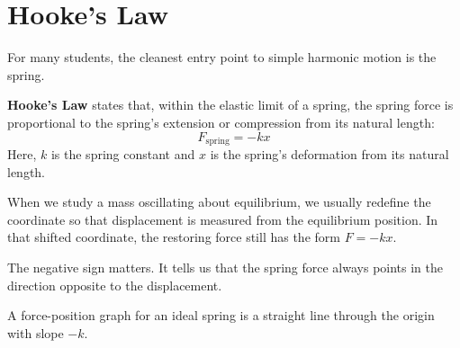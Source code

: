 

\usepackage{enumitem}
\usepackage{hyperref}
\usepackage{mathtools}
\usepackage{siunitx}

\hypersetup{colorlinks=true,linkcolor=blue,urlcolor=blue}

\newcommand{\dd}{\mathrm{d}}
\newcommand{\abs}[1]{\left|#1\right|}



\maketitle

\section{Hooke's Law}
For many students, the cleanest entry point to simple harmonic motion is the spring.

\textbf{Hooke's Law} states that, within the elastic limit of a spring, the spring force is proportional to the spring's extension or compression from its natural length:
\begin{equation}
    F_{\text{spring}} = -kx
\end{equation}
Here, $k$ is the spring constant and $x$ is the spring's deformation from its natural length.

When we study a mass oscillating about equilibrium, we usually redefine the coordinate so that displacement is measured from the equilibrium position. In that shifted coordinate, the restoring force still has the form $F=-kx$.

The negative sign matters. It tells us that the spring force always points in the direction opposite to the displacement.

\begin{center}

\small A force-position graph for an ideal spring is a straight line through the origin with slope $-k$.
\end{center}

